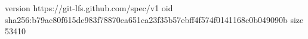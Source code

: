 version https://git-lfs.github.com/spec/v1
oid sha256:b79ac80f615de983f78870ea651ca23f35b57ebff4f574f0141168c0b049090b
size 53410
